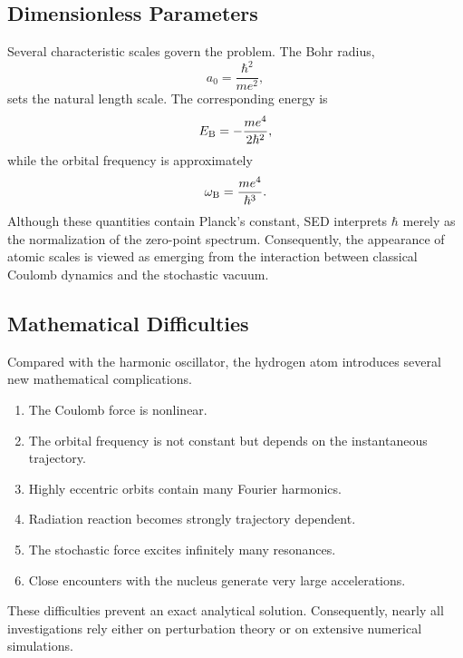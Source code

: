 \subsection{Dimensionless Parameters}
Several characteristic scales govern the problem.
The Bohr radius,
\begin{equation}
a_0=\frac{\hbar^2}{me^2},
\end{equation}
sets the natural length scale.
The corresponding energy is
\begin{equation}
E_{\rm B}=-\frac{me^4}{2\hbar^2},
\end{equation}
while the orbital frequency is approximately
\begin{equation}
\omega_{\rm B}=\frac{me^4}{\hbar^3}.
\end{equation}
Although these quantities contain Planck's constant, SED interprets
$\hbar$ merely as the normalization of the zero-point spectrum.
Consequently, the appearance of atomic scales is viewed as emerging from
the interaction between classical Coulomb dynamics and the stochastic
vacuum.
\subsection{Mathematical Difficulties}
Compared with the harmonic oscillator, the hydrogen atom introduces
several new mathematical complications.
\begin{enumerate}
\item
The Coulomb force is nonlinear.
\item
The orbital frequency is not constant but depends on the instantaneous
trajectory.
\item
Highly eccentric orbits contain many Fourier harmonics.
\item
Radiation reaction becomes strongly trajectory dependent.
\item
The stochastic force excites infinitely many resonances.
\item
Close encounters with the nucleus generate very large accelerations.
\end{enumerate}
These difficulties prevent an exact analytical solution.
Consequently, nearly all investigations rely either on perturbation
theory or on extensive numerical simulations.
